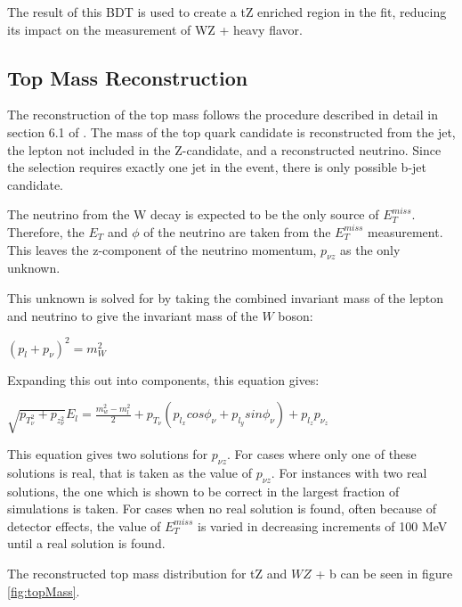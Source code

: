 \documentclass[NOTE, atlasdraft=true, texlive=2016, UKenglish]{\ATLASLATEXPATH atlasdoc}
\begin{document}
The result of this BDT is used to create a tZ enriched region in the fit, reducing its impact on the measurement of WZ + heavy flavor.

\subsection{Top Mass Reconstruction}
\label{subsec:topMass}

 The reconstruction of the top mass follows the procedure described in detail in section 6.1 of \cite{ttZ_paper}. The mass of the top quark candidate is reconstructed from the jet, the lepton not included in the Z-candidate, and a reconstructed neutrino. Since the selection requires exactly one jet in the event, there is only possible b-jet candidate. 

The neutrino from the W decay is expected to be the only source of $E_T^{miss}$. Therefore, the $E_T$ and $\phi$ of the neutrino are taken from the $E_T^{miss}$ measurement. This leaves the z-component of the neutrino momentum, $p_{\nu z}$ as the only unknown.

This unknown is solved for by taking the combined invariant mass of the lepton and neutrino to give the invariant mass of the $W$ boson:

\begin{center}
   $(p_l + p_{\nu})^2 = m_W^2$ \\ 
\end{center} 

Expanding this out into components, this equation gives:

\begin{center}
   $\sqrt{p_T_\nu^2+p_z_\nu^2}E_l = \frac{m^2_w-m^2_l}{2}+p_T_\nu(p_l_x cos\phi_\nu + p_l_y sin \phi_\nu) + p_l_z p_\nu_z$ \\ 
\end{center} 

This equation gives two solutions for $p_{\nu z}$. For cases where only one of these solutions is real, that is taken as the value of $p_{\nu z}$. For instances with two real solutions, the one which is shown to be correct in the largest fraction of simulations is taken. For cases when no real solution is found, often because of detector effects, the value of $E_T^{miss}$ is varied in decreasing increments of 100 MeV until a real solution is found.

The reconstructed top mass distribution for tZ and $WZ$ + b can be seen in figure \ref{fig:topMass}.
\end{document}
